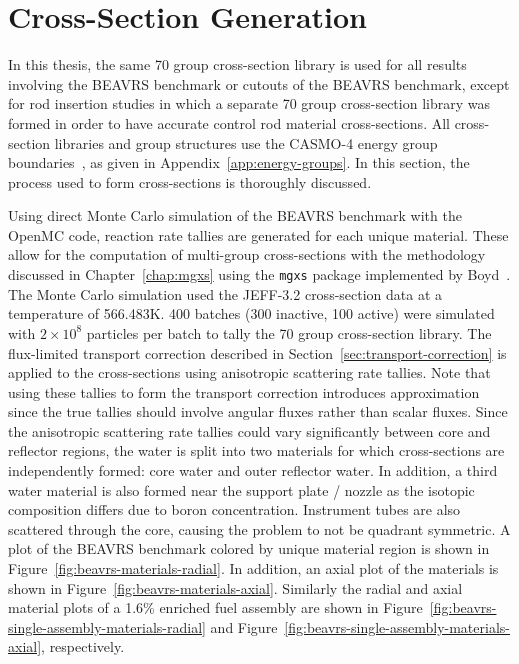 \section{Cross-Section Generation}
\label{sec:beavrs-xs-gen}

In this thesis, the same 70 group cross-section library is used for all results involving the BEAVRS benchmark or cutouts of the BEAVRS benchmark, except for rod insertion studies in which a separate 70 group cross-section library was formed in order to have accurate control rod material cross-sections. All cross-section libraries and group structures use the CASMO-4 energy group boundaries~\cite{edenius1995casmo}, as given in Appendix~\ref{app:energy-groups}. In this section, the process used to form cross-sections is thoroughly discussed.

Using direct Monte Carlo simulation of the BEAVRS benchmark with the OpenMC code, reaction rate tallies are generated for each unique material. These allow for the computation of multi-group cross-sections with the methodology discussed in Chapter~\ref{chap:mgxs} using the \texttt{mgxs} package implemented by Boyd~\cite{boyd2017thesis}. The Monte Carlo simulation used the JEFF-3.2 cross-section data at a temperature of 566.483K. 400 batches (300 inactive, 100 active) were simulated with $2 \times 10^8$ particles per batch to tally the 70 group cross-section library. The flux-limited transport correction described in Section~\ref{sec:transport-correction} is applied to the cross-sections using anisotropic scattering rate tallies. Note that using these tallies to form the transport correction introduces approximation since the true tallies should involve angular fluxes rather than scalar fluxes. Since the anisotropic scattering rate tallies could vary significantly between core and reflector regions, the water is split into two materials for which cross-sections are independently formed: core water and outer reflector water. In addition, a third water material is also formed near the support plate / nozzle as the isotopic composition differs due to boron concentration. Instrument tubes are also scattered through the core, causing the problem to not be quadrant symmetric. A plot of the BEAVRS benchmark colored by unique material region is shown in Figure~\ref{fig:beavrs-materials-radial}. In addition, an axial plot of the materials is shown in Figure~\ref{fig:beavrs-materials-axial}. Similarly the radial and axial material plots of a 1.6\% enriched fuel assembly are shown in Figure~\ref{fig:beavrs-single-assembly-materials-radial} and Figure~\ref{fig:beavrs-single-assembly-materials-axial}, respectively.


